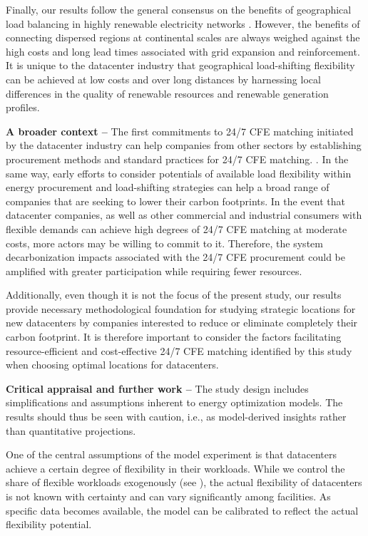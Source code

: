 Finally, our results follow the general consensus on the benefits of geographical load balancing in highly renewable electricity networks \cite{schlachtbergerBenefitsCooperationHighly2017}.
However, the benefits of connecting dispersed regions at continental scales are always weighed against the high costs and long lead times associated with grid expansion and reinforcement.
It is unique to the datacenter industry that geographical load-shifting flexibility can be achieved at low costs and over long distances by harnessing local differences in the quality of renewable resources and renewable generation profiles.

\textbf{A broader context --} The first commitments to 24/7 CFE matching initiated by the datacenter industry can help companies from other sectors by establishing procurement methods and standard practices for 24/7 CFE matching. \cite{xu-247CFE-report}.
In the same way, early efforts to consider potentials of available load flexibility within energy procurement and load-shifting strategies can help a broad range of companies that are seeking to lower their carbon footprints.
In the event that datacenter companies, as well as other commercial and industrial consumers with flexible demands can achieve high degrees of 24/7 CFE matching at moderate costs, more actors may be willing to commit to it.
Therefore, the system decarbonization impacts associated with the 24/7 CFE procurement \cite{riepinMeansCostsSystemlevel2023} could be amplified with greater participation while requiring fewer resources.

Additionally, even though it is not the focus of the present study, our results provide necessary methodological foundation for studying strategic locations for new datacenters by companies interested to reduce or eliminate completely their carbon footprint. It is therefore important to consider the factors facilitating resource-efficient and cost-effective 24/7 CFE matching identified by this study when choosing optimal locations for datacenters.

\textbf{Critical appraisal and further work --} The study design includes simplifications and assumptions inherent to energy optimization models. The results should thus be seen with caution, i.e., as model-derived insights rather than quantitative projections.

One of the central assumptions of the model experiment is that datacenters achieve a certain degree of flexibility in their workloads. While we control the share of flexible workloads exogenously (see ), the actual flexibility of datacenters is not known with certainty and can vary significantly among facilities.
As specific data becomes available, the model can be calibrated to reflect the actual flexibility potential.


